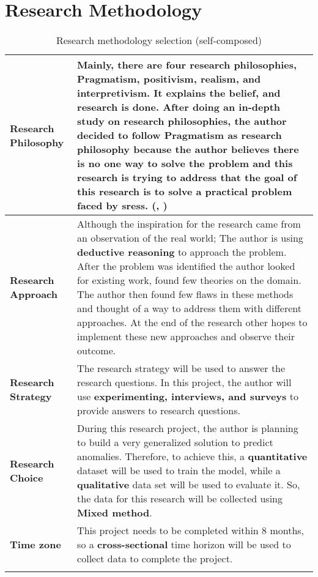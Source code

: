 \section{Research Methodology} \label{sec:methodology}


\begin{longtable}{|p{35mm}|p{120mm}|}
\hline
  \textbf{Research Philosophy} & 
  Mainly, there are four research philosophies, Pragmatism, positivism, realism, and interpretivism. It explains the belief, and research is done. After doing an in-depth study on research philosophies, the author decided to follow \textbf{Pragmatism} as research philosophy because the author believes there is no one way to solve the problem and this research is trying to address that the goal of this research is to solve a practical problem faced by \acp{sres}. (\cite{1Philoso75:online}, \cite{Pragmati87:online})
  \\ \hline
  
  \textbf{Research Approach} & 
  Although the inspiration for the research came from an observation of the real world; The author is using \textbf{deductive reasoning} to approach the problem. After the problem was identified the author looked for existing work, found few theories on the domain. The author then found few flaws in these methods and thought of a way to address them with different approaches. At the end of the research other hopes to implement these new approaches and observe their outcome.
  \\ \hline
  
  \textbf{Research Strategy} & 
  The research strategy will be used to answer the research questions. In this project, the author will use \textbf{experimenting, interviews, and surveys} to provide answers to research questions.
  \\ \hline
  
  \textbf{Research Choice} & 
  During this research project, the author is planning to build a very generalized solution to predict anomalies.  Therefore, to achieve this, a \textbf{quantitative} dataset will be used to train the model, while a \textbf{qualitative} data set will be used to evaluate it. So, the data for this research will be collected using \textbf{Mixed method}.
  \\ \hline
  
  \textbf{Time zone} & 
  This project needs to be completed within 8 months, so a \textbf{cross-sectional} time horizon will be used to collect data to complete the project.
  \\ \hline
  \caption{Research methodology selection (self-composed)}
\end{longtable}
